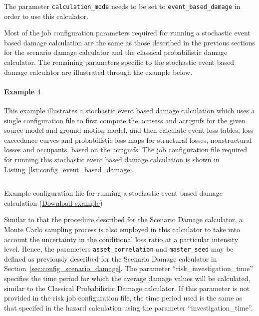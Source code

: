 The parameter \Verb+calculation_mode+ needs to be set to
\Verb+event_based_damage+ in order to use this calculator.

Most of the job configuration parameters required for running a stochastic
event based damage calculation are the same as those described in the previous
sections for the scenario damage calculator and the classical probabilistic damage
calculator. The remaining parameters specific to the stochastic event based
damage calculator are illustrated through the example below.


\paragraph{Example 1}

This example illustrates a stochastic event based damage calculation which uses
a single configuration file to first compute the \glspl{acr:ses} and
\glspl{acr:gmf} for the given source model and ground motion model, and then
calculate event loss tables, loss exceedance curves and probabilistic
loss maps for structural losses, nonstructural losses and occupants,
based on the \glspl{acr:gmf}. The job configuration file required for
running this stochastic event based damage calculation is shown in
Listing~\ref{lst:config_event_based_damage}.

\begin{listing}[htbp]
  \inputminted[firstline=1,firstnumber=1,fontsize=\scriptsize
  ,frame=single,bgcolor=lightgray,linenos,label=job.ini]{ini}{oqum/risk/verbatim/config_event_based_damage.ini}
  \caption{Example configuration file for running a stochastic event based damage calculation (\href{https://raw.githubusercontent.com/gem/oq-engine/master/doc/manual/oqum/risk/verbatim/config_event_based_damage.ini}{Download example})}
  \label{lst:config_event_based_damage}
\end{listing}

Similar to that the procedure described for the Scenario Damage calculator, a
Monte Carlo sampling process is also employed in this calculator to take into
account the uncertainty in the conditional loss ratio at a particular
intensity level. Hence, the parameters \Verb+asset_correlation+ and
\Verb+master_seed+ may be defined as previously described for the Scenario
Damage calculator in Section~\ref{sec:config_scenario_damage}. The parameter
``risk\_investigation\_time'' specifies the time period for which the average
damage values will be calculated, similar to the
Classical Probabilistic Damage calculator. If this parameter is not provided in
the risk job configuration file, the time period used is the same as that
specifed in the hazard calculation using the parameter ``investigation\_time''.

